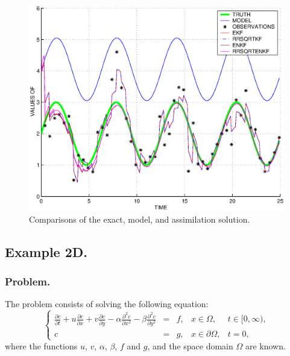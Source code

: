 \documentclass[12pt]{article}
\begin{document}
\begin{figure}[htb]
\begin{center}
\includegraphics[width=12.4cm]{example0d_values.eps}
\caption{Comparisons of the exact, model, and assimilation solution.}
\label{fig0d}
\end{center}
\end{figure}

\subsection{Example 2D.}

\subsubsection{Problem.}
The problem consists of solving the following equation:
\begin{equation} \label{equation: problem 2d example}
\left\{ \begin{array}{rclll} \displaystyle{\frac{\partial c}{\partial t} + u \frac{\partial c}{\partial x} + v \frac{\partial c}{\partial y} - \alpha \frac{\partial^2 c}{\partial x^2} - \beta \frac{\partial^2 c}{\partial y^2}} & = & f, & x \in \Omega, & t \in [ 0 , \infty ), \\ c & = & g, & x \in \partial \Omega, & t = 0, \end{array} \right.
\end{equation}
where the functions $u$, $v$, $\alpha$, $\beta$, $f$ and $g$, and the space domain $\Omega$ are known. 
\end{document}
